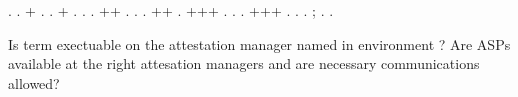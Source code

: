 \documentclass[12pt]{report}
\begin{document}
\begin{coqdoccode}
.  .\coqdoceol
\coqdocindent{1.00em}
+ . .\coqdoceol
\coqdocindent{1.00em}
+ .      .  .\coqdoceol
\coqdocindent{1.00em}
++ . .  .\coqdoceol
\coqdocindent{1.00em}
++  .\coqdoceol
\coqdocindent{1.00em}
+++ . .  .\coqdoceol
\coqdocindent{1.00em}
+++ .  . .  ; .\coqdoceol
\coqdocnoindent
{}.\coqdoceol
\coqdocemptyline
\coqdocemptyline
\end{coqdoccode}
Is term  exectuable on the attestation manager named  in 
    environment ?  Are ASPs available at the right attesation managers
    and are necessary communications allowed?
\end{document}
